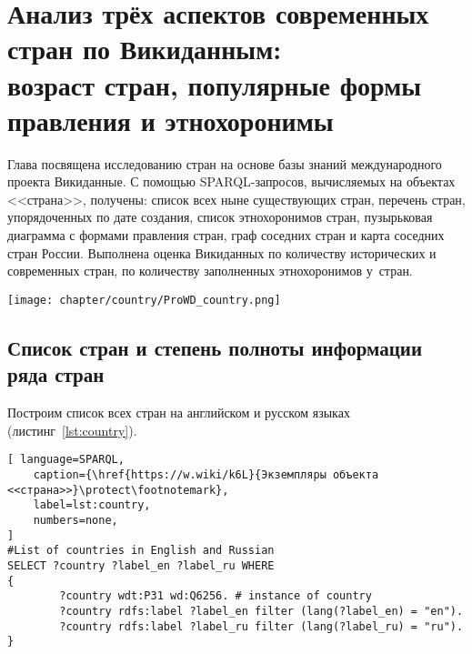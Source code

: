 \chapter[Анализ стран: возраст, формы правления и этнохоронимы]{Анализ трёх аспектов современных стран по Викиданным:\\возраст стран, популярные формы правления и этнохоронимы}
\label{ch:country}

Глава посвящена исследованию стран на основе базы знаний международного проекта Викиданные. 
С помощью SPARQL-запросов, вычисляемых на объектах <<страна>>, получены: 
список всех ныне существующих стран, перечень стран, упорядоченных по дате создания, 
список этнохоронимов стран, 
пузырьковая диаграмма с формами правления стран, 
граф соседних стран и карта соседних стран России. 
Выполнена оценка Викиданных по количеству исторических и современных стран, 
по количеству заполненных этнохоронимов у~стран. 

\begin{marginfigure}[7\baselineskip]
    \texttt{[image: chapter/country/ProWD\_country.png]}
    \caption[Степень заполненности свойств стран на Викиданных]%
	{%
Высокая степень заполнения по числу свойств объекта Викиданных \href{https://www.wikidata.org/wiki/Q6256}{страна (Q6256)}.  Данные получены с помощью сервиса \href{https://prowd.id/dashboards/86b6f91a8131/profile}{ProWD.id}, 2020 год. \emph{Коэффициент Джини равен 0.091.}
	}%
	\label{fig:ProWD_country}%
\end{marginfigure}


\section{Список стран и степень полноты информации ряда стран}

Построим список всех стран на английском и русском языках (листинг~\ref{lst:country}).

\begin{lstlisting}[ language=SPARQL, 
    caption={\href{https://w.wiki/k6L}{Экземпляры объекта <<страна>>}\protect\footnotemark},
    label=lst:country, 
    numbers=none,
]
#List of countries in English and Russian
SELECT ?country ?label_en ?label_ru WHERE
{
		?country wdt:P31 wd:Q6256. # instance of country
		?country rdfs:label ?label_en filter (lang(?label_en) = "en").
		?country rdfs:label ?label_ru filter (lang(?label_ru) = "ru").
}
\end{lstlisting}

